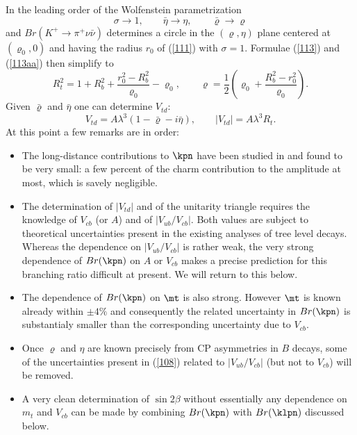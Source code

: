 In the leading order of the Wolfenstein parametrization
%
\begin{equation}\label{113ab}
\sigma \to 1, \qquad \bar\eta \to \eta, \qquad \bar\varrho \to \varrho
\end{equation}
%
and $Br(K^+ \to \pi^+ \nu \bar\nu)$ determines a circle in the
$(\varrho,\eta)$ plane centered at $(\varrho_0,0)$ and having the radius
$r_0$ of (\ref{111}) with $\sigma =1$. Formulae (\ref{113}) and
(\ref{113aa}) then simplify to \cite{BB3}
%
\begin{equation}\label{113a}
R_t^2 = 1 + R_b^2 + \frac{r_0^2 - R_b^2}{\varrho_0} - \varrho_0, \qquad
\varrho = \frac{1}{2} \left( \varrho_0 + \frac{R_b^2 - r_0^2}{\varrho_0}
\right).
\end{equation}
Given $\bar\varrho$ and $\bar\eta$ one can determine $V_{td}$:
\begin{equation}\label{vtdrhoeta}
V_{td}=A \lambda^3(1-\bar\varrho-i\bar\eta),\qquad
|V_{td}|=A \lambda^3 R_t.
\end{equation}
At this point a few remarks are in
order:
\begin{itemize}
\item
The long-distance contributions to $\kpn$ have been studied in
\cite{RS} and found to be
very small: a few percent of the charm contribution to the amplitude at
most, which is savely negligible.
\item
The determination of $|V_{td}|$ and of the unitarity triangle requires
the knowledge of $V_{cb}$ (or $A$) and of $|V_{ub}/V_{cb}|$. Both
values are subject to theoretical uncertainties present in the existing
analyses of tree level decays. Whereas the dependence on
$|V_{ub}/V_{cb}|$ is rather weak, the very strong dependence of
$Br(\kpn)$ on $A$ or $V_{cb}$ makes a precise prediction for this
branching ratio difficult at present. We will return to this below.
\item
The dependence of $Br(\kpn)$ on $\mt$ is also strong. However $\mt$
is known already  within $\pm 4\%$ and
consequently the related uncertainty in 
$Br(\kpn)$ is substantialy smaller than the corresponding uncertainty 
due to $V_{cb}$.
\item
Once $\varrho$ and $\eta$ are known precisely from CP asymmetries in
$B$ decays, some of the uncertainties present in (\ref{108}) related
to $|V_{ub}/V_{cb}|$ (but not to $V_{cb}$) will be removed.
\item
A very clean determination of $\sin 2\beta$ without essentially
any dependence on $m_t$ and $V_{cb}$ can be made by combining
$Br(\kpn)$ with $Br(\klpn)$ discussed below. 
\end{itemize}

